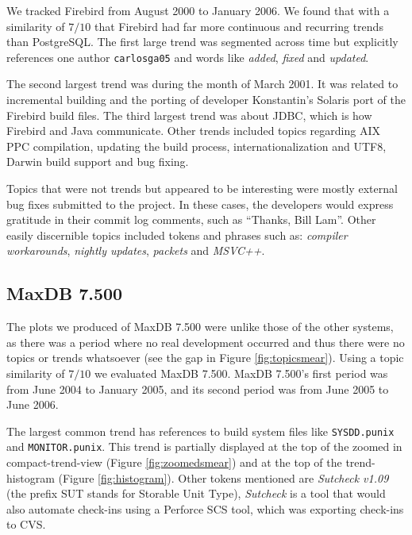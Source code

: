 \documentclass[times, 10pt,twocolumn]{article}
\newcommand{\shrinkit}{\vspace*{-.3em}}
\begin{document}
We tracked Firebird from August 2000 to January 2006. We found that with a
similarity of $7/10$ that Firebird had far more continuous and
recurring trends than PostgreSQL.  The first large trend was segmented
across time but explicitly references one author \texttt{carlosga05}
and words like \emph{added}, \emph{fixed} and \emph{updated}.

The second largest trend was during the month of March 2001. It was
related to incremental building and the porting of developer
Konstantin's Solaris port of the Firebird build files. The third
largest trend was about JDBC, which is how Firebird and Java
communicate.  Other trends included topics regarding AIX PPC
compilation, updating the build process, internationalization and
UTF8, Darwin build support and bug fixing.

Topics that were not trends but appeared to be interesting were mostly
external bug fixes submitted to the project.  In these cases, the
developers would express gratitude in their commit log comments, such
as ``Thanks, Bill Lam''.  Other easily discernible topics included
tokens and phrases such as: \emph{compiler workarounds}, \emph{nightly
  updates}, \emph{packets} and \emph{MSVC++}.


\shrinkit
\subsection{MaxDB 7.500}
\shrinkit






The plots we produced of MaxDB 7.500 were unlike those of the other
systems, as there was a period where no real development occurred and
thus there were no topics or trends whatsoever (see the gap in Figure
\ref{fig:topicsmear}). Using a topic similarity of $7/10$ we evaluated
MaxDB 7.500. MaxDB 7.500's first period was from June 2004 to January
2005, and its second period was from June 2005 to June 2006.

The largest common trend has references to build system files like
\texttt{SYSDD.punix} and \texttt{MONITOR.punix}.  This trend is
partially displayed at the top of the zoomed in compact-trend-view
(Figure \ref{fig:zoomedsmear}) and at the top of the trend-histogram
(Figure \ref{fig:histogram}).  Other tokens mentioned are
\emph{Sutcheck v1.09} (the prefix SUT stands for Storable Unit Type),
\emph{Sutcheck} is a tool that would also automate check-ins using a Perforce SCS
tool, which was exporting check-ins to CVS.
\end{document}

